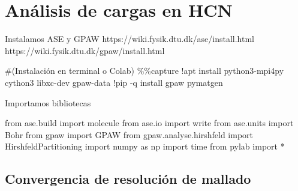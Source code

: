 \documentclass[
  letterpaper,
  DIV=11,
  numbers=noendperiod]{scrreprt}
\newenvironment{Shaded}{\begin{snugshade}}{\end{snugshade}}
\newcommand{\CommentTok}[1]{\textcolor[rgb]{0.37,0.37,0.37}{#1}}
\newcommand{\ImportTok}[1]{\textcolor[rgb]{0.00,0.46,0.62}{#1}}
\newcommand{\NormalTok}[1]{\textcolor[rgb]{0.00,0.23,0.31}{#1}}
\newcommand{\OperatorTok}[1]{\textcolor[rgb]{0.37,0.37,0.37}{#1}}
\begin{document}

\hypertarget{anuxe1lisis-de-cargas-en-hcn}{%
\chapter{Análisis de cargas en HCN}\label{anuxe1lisis-de-cargas-en-hcn}}

Instalamos ASE y GPAW https://wiki.fysik.dtu.dk/ase/install.html
https://wiki.fysik.dtu.dk/gpaw/install.html

\begin{Shaded}
\begin{Highlighting}[]
\CommentTok{\#(Instalación en terminal o Colab)}
\OperatorTok{\%\%}\NormalTok{capture}
\OperatorTok{!}\NormalTok{apt install python3}\OperatorTok{{-}}\NormalTok{mpi4py cython3 libxc}\OperatorTok{{-}}\NormalTok{dev gpaw}\OperatorTok{{-}}\NormalTok{data}
\OperatorTok{!}\NormalTok{pip }\OperatorTok{{-}}\NormalTok{q install gpaw pymatgen}
\end{Highlighting}
\end{Shaded}

Importamos bibliotecas

\begin{Shaded}
\begin{Highlighting}[]
\ImportTok{from}\NormalTok{ ase.build }\ImportTok{import}\NormalTok{ molecule}
\ImportTok{from}\NormalTok{ ase.io }\ImportTok{import}\NormalTok{ write}
\ImportTok{from}\NormalTok{ ase.units }\ImportTok{import}\NormalTok{ Bohr}
\ImportTok{from}\NormalTok{ gpaw }\ImportTok{import}\NormalTok{ GPAW}
\ImportTok{from}\NormalTok{ gpaw.analyse.hirshfeld }\ImportTok{import}\NormalTok{ HirshfeldPartitioning}
\ImportTok{import}\NormalTok{ numpy }\ImportTok{as}\NormalTok{ np}
\ImportTok{import}\NormalTok{ time}
\ImportTok{from}\NormalTok{ pylab }\ImportTok{import} \OperatorTok{*}
\end{Highlighting}
\end{Shaded}

\hypertarget{convergencia-de-resoluciuxf3n-de-mallado}{%
\section{Convergencia de resolución de
mallado}\label{convergencia-de-resoluciuxf3n-de-mallado}}
\end{document}
